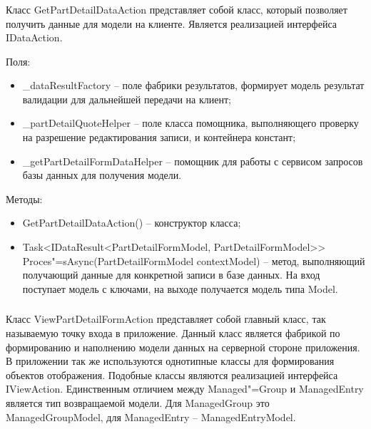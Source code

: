 \subsubsection{}
\label{sub:arch_and_mod:data_layer:get_part_detail}

Класс GetPartDetailDataAction представляет собой класс, который позволяет получить данные для модели на клиенте. Является реализацией интерфейса IDataAction.

Поля:
\begin{itemize}
  \item \_dataResultFactory – поле фабрики результатов, формирует модель результат валидации для дальнейшей передачи на клиент;
  \item \_partDetailQuoteHelper – поле класса помощника, выполняющего проверку на разрешение редактирования записи, и контейнера констант;
  \item \_getPartDetailFormDataHelper – помощник для работы с сервисом запросов базы данных для получения модели.
\end{itemize}

Методы:
\begin{itemize}
  \item GetPartDetailDataAction() – конструктор класса;
  \item Task<IDataResult<PartDetailFormModel, PartDetailFormModel>> Proces"=sAsync(PartDetailFormModel contextModel) – метод, выполняющий получающий данные для конкретной записи в базе данных. На вход поступает модель с ключами, на выходе получается модель типа Model.
\end{itemize}

\subsubsection{}
\label{sub:arch_and_mod:data_layer:view_part_detail}

Класс ViewPartDetailFormAction представляет собой главный класс, так называемую точку входа в приложение. Данный класс является фабрикой по формированию и наполнению модели данных на серверной стороне приложения. В приложении так же используются однотипные классы для формирования объектов отображения. Подобные классы являются реализацией интерфейса IViewAction. Единственным отличием между Managed"=Group и ManagedEntry является тип возвращаемой модели. Для ManagedGroup это ManagedGroupModel, для ManagedEntry – ManagedEntryModel.

